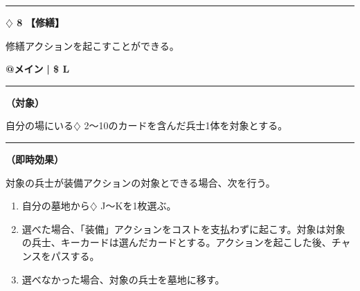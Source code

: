 \documentclass[twocolumn,a5paper,papersize,10pt]{jarticle}
\begin{document}
\vspace{-1zh}

 
 
 
 
 

\vspace{3mm} %
\hrule height 0.5mm depth 0mm width 66.5mm %
\vspace{1mm} %
{\Large\bf $\diamondsuit$ 8} {\normalsize\bf【修繕】} %
\vspace{1mm} %

修繕アクションを起こすことができる。

\begin{tcolorbox}[title={\small\bf【Action】修繕}{\scriptsize （通常魔法）}]

{\scriptsize\bf @メイン }
  {\scriptsize\bf | \$ L }

\vspace{1mm} %
\hrule height 0.1mm depth 0mm width 62mm %
\vspace{1mm} %

{\bf（対象）}

自分の場にいる{\normalsize $\diamondsuit$} 2〜10のカードを含んだ兵士1体を対象とする。

\vspace{1mm} %
\hrule height 0.1mm depth 0mm width 62mm %
\vspace{1mm} %

{\bf（即時効果）}

対象の兵士が装備アクションの対象とできる場合、次を行う。


\vspace{-1zh}%
\begin{enumerate}
\setlength{\leftskip}{-0.3cm}
\setlength{\parskip}{0pt} %

\item 自分の墓地から{\normalsize $\diamondsuit$} J〜Kを1枚選ぶ。

\item 選べた場合、「装備」アクションをコストを支払わずに起こす。対象は対象の兵士、キーカードは選んだカードとする。アクションを起こした後、チャンスをパスする。

\item 選べなかった場合、対象の兵士を墓地に移す。
\vspace{-1zh}%
\end{enumerate}

\vspace{1mm} %
\end{tcolorbox}
\end{document}
